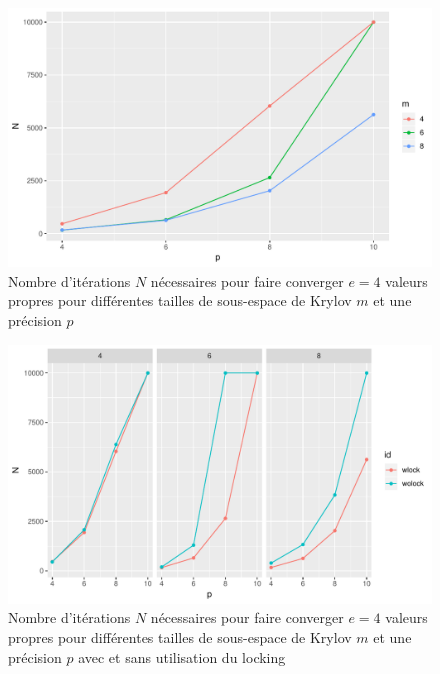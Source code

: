 \documentclass[11pt,a4paper]{article}
\begin{document}
\begin{figure}
	\centering
	\includegraphics[width=0.8\linewidth, keepaspectratio]{plots/Nvsp-m_e4.pdf}
	\caption{Nombre d'itérations $N$ nécessaires pour faire converger $e = 4$ valeurs propres pour différentes tailles de sous-espace de Krylov $m$ et une précision $p$ \label{fig:Nvsp-m_e4}}
\end{figure}

\begin{figure}
	\centering
	\includegraphics[width=0.8\linewidth, keepaspectratio]{plots/Nvsp_complock.pdf}
	\caption{Nombre d'itérations $N$ nécessaires pour faire converger $e = 4$ valeurs propres pour différentes tailles de sous-espace de Krylov $m$ et une précision $p$ avec et sans utilisation du locking \label{fig:Nvsp_complock}}
\end{figure}
\end{document}
